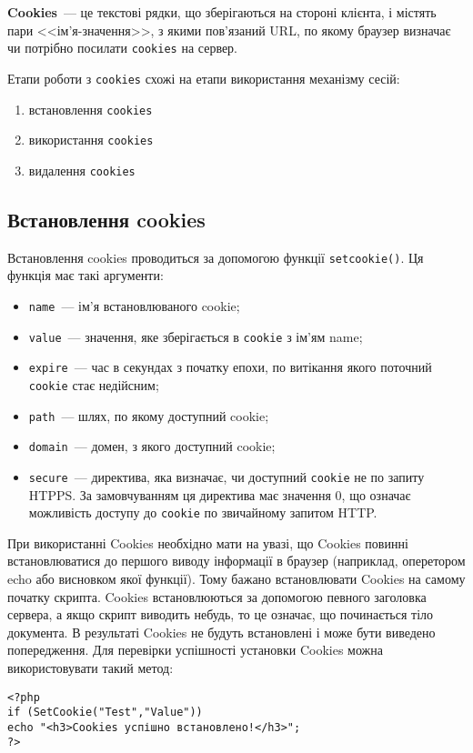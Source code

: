 \textbf{Cookies}~--- це текстові рядки, що зберігаються на стороні клієнта, і містять пари <<ім'я-значення>>, з якими пов'язаний URL, по якому браузер визначає чи потрібно посилати \verb'cookies' на сервер.

Етапи роботи з  \verb'cookies' схожі на етапи використання механізму сесій:
\begin{enumerate}
\item встановлення \verb'cookies'
\item використання \verb'cookies'
\item видалення \verb'cookies'
\end{enumerate}
\subsection*{Встановлення cookies}
Встановлення cookies проводиться за допомогою функції \verb'setcookie()'. Ця функція має такі аргументи:
\begin{itemize}
\item \verb'name'~--- ім'я встановлюваного cookie;
\item \verb'value'~--- значення, яке зберігається в \verb'cookie' з ім'ям name;
\item \verb'expire'~--- час в секундах з початку епохи, по витікання якого поточний \verb'cookie' стає недійсним;
\item \verb'path'~--- шлях, по якому доступний cookie;
\item \verb'domain'~--- домен, з якого доступний cookie;
\item \verb'secure'~--- директива, яка визначає, чи доступний \verb'cookie' не по запиту HTPPS. За замовчуванням ця директива має значення 0, що означає можливість доступу до \verb'cookie' по звичайному запитом HTTP. 
\end{itemize}

При використанні Cookies необхідно мати на увазі, що Cookies повинні встановлюватися до першого виводу інформації в браузер (наприклад, оперетором echo або висновком якої функції). Тому бажано встановлювати Cookies на самому початку скрипта. Cookies встановлюються за допомогою певного заголовка сервера, а якщо скрипт виводить небудь, то це означає, що починається тіло документа. В результаті Cookies не будуть встановлені і може бути виведено попередження. Для перевірки успішності установки Cookies можна використовувати такий метод:

\begin{verbatim}
<?php
if (SetCookie("Test","Value")) 
echo "<h3>Cookies успішно встановлено!</h3>";
?>
\end{verbatim}

